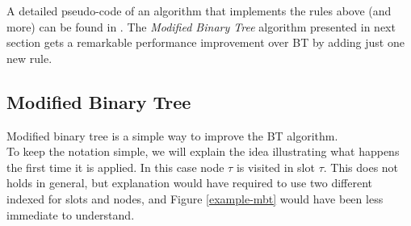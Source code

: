 \documentclass[12pt,a4paper]{report}
\newcommand{\rev}[1]{\textcolor{Cerulean}{#1}}
\begin{document}
A detailed pseudo-code of an algorithm that implements the rules above (and more) can be found in \cite{popovski}. The \emph{Modified Binary Tree} algorithm presented in next section gets a remarkable performance improvement over BT by adding just one new rule.\\

\subsection{Modified Binary Tree}
\label{se:MBT}

Modified binary tree is a simple way to improve the BT algorithm.\\ 
\rev{
To keep the notation simple, we will explain the idea illustrating what happens the first time it is applied. In this case  node $\tau$ is visited in slot $\tau$. This does not holds in general, but explanation would have required to use two different indexed for slots and nodes, and Figure \ref{example-mbt} would have been less immediate to understand.\\}
\end{document}
